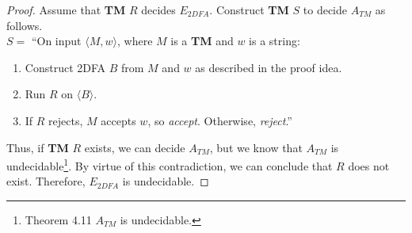 \documentclass[11pt]{article}
\begin{document}
\begin{proof}
Assume that \textbf{TM} $R$ decides $E_{2DFA}$. Construct \textbf{TM} $S$ to decide $A_{TM}$ as follows. \\

$S =$ \textquotedblleft On input $\langle M, w \rangle$, where $M$ is a \textbf{TM} and $w$ is a string:
\begin{enumerate}
\item Construct 2DFA $B$ from $M$ and $w$ as described in the proof idea.
\item Run $R$ on $\langle B \rangle$.
\item If $R$ rejects, $M$ accepts $w$, so \textit{accept}. Otherwise, \textit{reject}.\textquotedblright
\end{enumerate}
Thus, if \textbf{TM} $R$ exists, we can decide $A_{TM}$, but we know that $A_{TM}$ is undecidable\footnote{Theorem 4.11 $A_{TM}$ is undecidable.}. By virtue of this contradiction, we can conclude that $R$ does not exist. Therefore, $E_{2DFA}$ is undecidable.
\end{proof}
\end{document}
